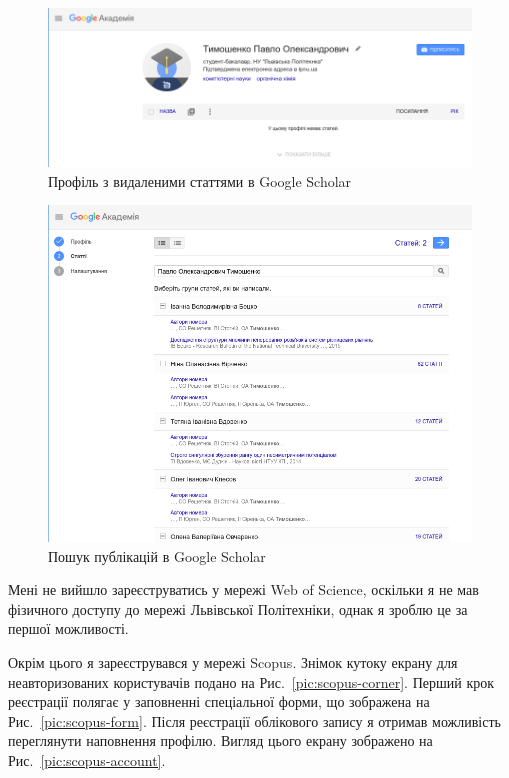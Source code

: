 \documentclass[oneside,14pt,a4paper]{extreport}
\begin{document}
\begin{figure}[H]
    \centering
    \includegraphics[width=15cm]{imgs/scholar_deleted.png}
    \caption{Профіль з видаленими статтями в Google Scholar}
    \label{pic:scholar-profile-deleted}
\end{figure}

\begin{figure}[H]
    \centering
    \includegraphics[width=15cm]{imgs/scholar_search.png}
    \caption{Пошук публікацій в Google Scholar}
    \label{pic:scholar-search}
\end{figure}

Мені не вийшло зареєструватись у мережі Web of Science, оскільки я не мав фізичного доступу до мережі Львівської Політехніки, однак я зроблю це за першої можливості.

Окрім цього я зареєструвався у мережі Scopus. Знімок кутоку екрану для неавторизованих користувачів подано на Рис.~\ref{pic:scopus-corner}. Перший крок реєстрації полягає у заповненні спеціальної форми, що зображена на Рис.~\ref{pic:scopus-form}. Після реєстрації облікового запису я отримав можливість переглянути наповнення профілю. Вигляд цього екрану зображено на Рис.~\ref{pic:scopus-account}.
\end{document}
